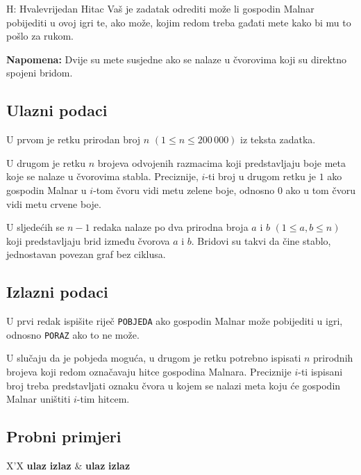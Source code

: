 \begin{statement}[
  timelimit=1 s,
  memorylimit=512 MiB,
]{H: Hvalevrijedan Hitac}
Vaš je zadatak odrediti može li gospodin Malnar pobijediti u ovoj igri te, ako
može, kojim redom treba gađati mete kako bi mu to pošlo za rukom.

\textbf{Napomena:} Dvije su mete susjedne ako se nalaze u čvorovima koji su
direktno spojeni bridom.

\subsection*{Ulazni podaci}
U prvom je retku prirodan broj $n$ $(1 \le n \le 200\,000)$ iz teksta zadatka.

U drugom je retku $n$ brojeva odvojenih razmacima koji predstavljaju boje meta
koje se nalaze u čvorovima stabla. Preciznije, $i$-ti broj u drugom retku je $1$
ako gospodin Malnar u $i$-tom čvoru vidi metu zelene boje, odnosno $0$ ako u tom
čvoru vidi metu crvene boje.

U sljedećih se $n-1$ redaka nalaze po dva prirodna broja $a$ i $b$ $(1 \le a, b
\le n)$ koji predstavljaju brid između čvorova $a$ i $b$. Bridovi su takvi da
čine stablo, jednostavan povezan graf bez ciklusa.

\subsection*{Izlazni podaci}
U prvi redak ispišite riječ \texttt{POBJEDA} ako gospodin Malnar može
pobijediti u igri, odnosno \texttt{PORAZ} ako to ne može.

U slučaju da je pobjeda moguća, u drugom je retku potrebno ispisati $n$
prirodnih brojeva koji redom označavaju hitce gospodina Malnara. Preciznije
$i$-ti ispisani broj treba predstavljati oznaku čvora u kojem se nalazi meta
koju će gospodin Malnar uništiti $i$-tim hitcem.

\subsection*{Probni primjeri}
\begin{tabularx}{\textwidth}{X'X}
  \textbf{ulaz}
  \linespread{1}{}
  \textbf{izlaz}
  \linespread{1}{} &
  \textbf{ulaz}
  \linespread{1}{}
  \textbf{izlaz}
  \linespread{1}{}
\end{tabularx}

\end{statement}

